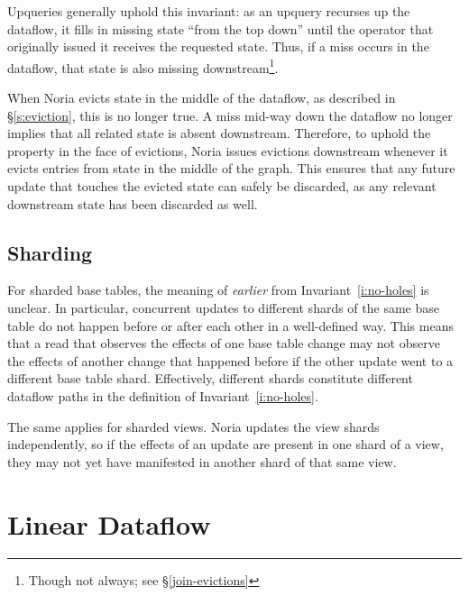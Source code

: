 Upqueries generally uphold this invariant: as an upquery recurses up the
dataflow, it fills in missing state ``from the top down'' until the operator
that originally issued it receives the requested state. Thus, if a miss occurs
in the dataflow, that state is also missing downstream\footnote{Though not
always; see \S\ref{join-evictions}}.

When Noria evicts state in the middle of the dataflow, as described in
\S\ref{s:eviction}, this is no longer true. A miss mid-way down the dataflow no
longer implies that all related state is absent downstream. Therefore, to uphold
the property in the face of evictions, Noria issues evictions downstream
whenever it evicts entries from state in the middle of the graph. This ensures
that any future update that touches the evicted state can safely be discarded,
as any relevant downstream state has been discarded as well.


\subsection{Sharding}

For sharded base tables, the meaning of \emph{earlier} from
Invariant~\ref{i:no-holes} is unclear. In particular, concurrent updates to
different shards of the same base table do not happen before or after each other
in a well-defined way. This means that a read that observes the effects of one
base table change may not observe the effects of another change that happened
before if the other update went to a different base table shard. Effectively,
different shards constitute different dataflow paths in the definition of
Invariant~\ref{i:no-holes}.

The same applies for sharded views. Noria updates the view shards independently,
so if the effects of an update are present in one shard of a view, they may not
yet have manifested in another shard of that same view.

\section{Linear Dataflow}
\label{s:partial:linear}

